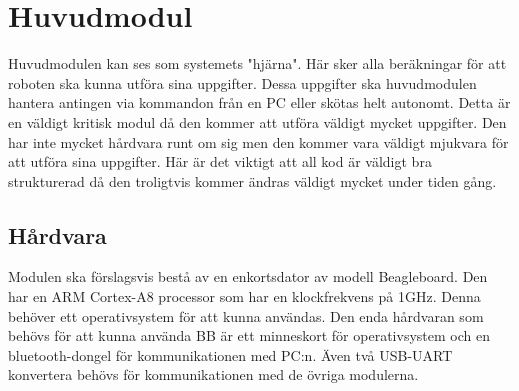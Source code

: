 \section{Huvudmodul}
Huvudmodulen kan ses som systemets "hjärna". Här sker alla beräkningar för att roboten ska kunna utföra sina uppgifter. Dessa uppgifter ska huvudmodulen hantera antingen via kommandon från en PC eller skötas helt autonomt. Detta är en väldigt kritisk modul då den kommer att utföra väldigt mycket uppgifter. Den har inte mycket hårdvara runt om sig men den kommer vara väldigt mjukvara för att utföra sina uppgifter. Här är det viktigt att all kod är väldigt bra strukturerad då den troligtvis kommer ändras väldigt mycket under tiden gång.
\subsection{Hårdvara}
Modulen ska förslagsvis bestå av en enkortsdator av modell Beagleboard. Den har en ARM Cortex-A8 processor som har en klockfrekvens på 1GHz. Denna behöver ett operativsystem för att kunna användas. Den enda hårdvaran som behövs för att kunna använda BB är ett minneskort för operativsystem och en bluetooth-dongel för kommunikationen med PC:n. Även två USB-UART konvertera behövs för kommunikationen med de övriga modulerna.
